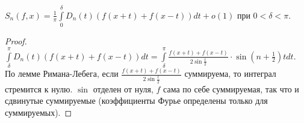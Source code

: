 \begin{consequence}
    $S_n(f, x) = \frac{1}{\pi} \int \limits_{0}^{\delta} D_n(t) (f(x + t) + f(x - t)) dt + o(1)$ при $0 < \delta < \pi$.
\end{consequence}

\begin{proof}
    $\int \limits_{\delta}^{\pi} D_n(t) (f(x + t) + f(x - t)) dt =
        \int \limits_{\delta}^{\pi} \frac{f(x + t) + f(x - t)}{2 \sin \frac{t}{2}} \cdot \sin (n + \frac{1}{2}) t dt$.
    По лемме Римана-Лебега, если $\frac{f(x + t) + f(x - t)}{2 \sin \frac{t}{2}}$ суммируема, то интеграл стремится к нулю.
    $\sin$ отделен от нуля, $f$ сама по себе суммируемая, так что и сдвинутые суммируемые (коэффициенты Фурье определены только для суммируемых).
\end{proof}


\newpage


